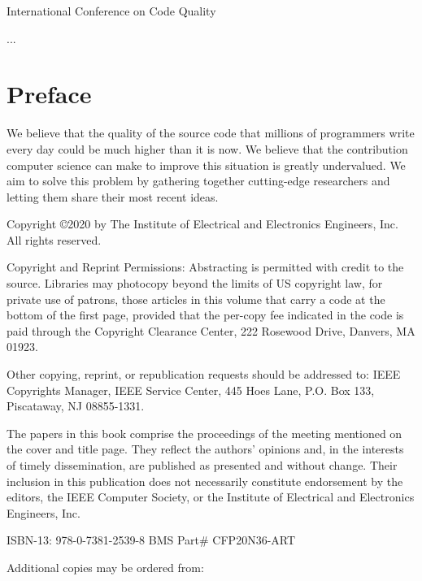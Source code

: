 \documentclass[12pt,a4,twosides]{book}
\begin{document}
International Conference on Code Quality

...

\newpage

\section{Preface}

We believe that the quality of the source code that millions of programmers
write every day could be much higher than it is now. We believe that the
contribution computer science can make to improve this situation is greatly
undervalued. We aim to solve this problem by gathering
together cutting-edge researchers and letting them share their most recent ideas.


\newpage

\begin{center}
Copyright \copyright 2020 by The Institute of Electrical and Electronics Engineers, Inc.\\
All rights reserved.
\end{center}

Copyright and Reprint Permissions: Abstracting is permitted with credit to the source. Libraries may photocopy beyond the limits of US copyright law, for private use of patrons, those articles in this volume that carry a code at the bottom of the first page, provided that the per-copy fee indicated in the code is paid through the Copyright Clearance Center, 222 Rosewood Drive, Danvers, MA 01923.

Other copying, reprint, or republication requests should be addressed to: IEEE Copyrights Manager, IEEE Service Center, 445 Hoes Lane, P.O. Box 133, Piscataway, NJ 08855-1331.

The papers in this book comprise the proceedings of the meeting mentioned on the cover and title page. They reflect the authors’ opinions and, in the interests of timely dissemination, are published as presented and without change. Their inclusion in this publication does not necessarily constitute endorsement by the editors, the IEEE Computer Society, or the Institute of Electrical and Electronics Engineers, Inc.

\begin{center}
ISBN-13: 978-0-7381-2539-8
BMS Part\# CFP20N36-ART
\end{center}

\begin{center}
Additional copies may be ordered from:
\end{center}
\end{document}
